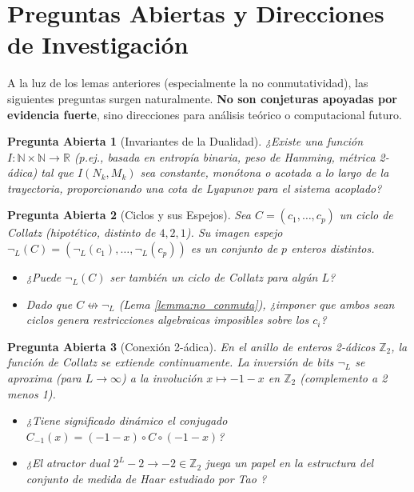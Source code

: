 \documentclass[11pt,a4paper]{article}
\newtheorem{question}{Pregunta Abierta}
\begin{document}
\section{Preguntas Abiertas y Direcciones de Investigación}
\label{sec:open}

A la luz de los lemas anteriores (especialmente la no conmutatividad), las siguientes preguntas surgen naturalmente. \textbf{No son conjeturas apoyadas por evidencia fuerte}, sino direcciones para análisis teórico o computacional futuro.

\begin{question}[Invariantes de la Dualidad]
\label{q:invariantes}
¿Existe una función $I: \mathbb{N} \times \mathbb{N} \to \mathbb{R}$ (p.ej., basada en entropía binaria, peso de Hamming, métrica 2-ádica) tal que $I(N_k, M_k)$ sea constante, monótona o acotada a lo largo de la trayectoria, proporcionando una cota de Lyapunov para el sistema acoplado?
\end{question}

\begin{question}[Ciclos y sus Espejos]
\label{q:ciclos}
Sea $C = (c_1, \dots, c_p)$ un ciclo de Collatz (hipotético, distinto de $4,2,1$). Su imagen espejo $\neg_L(C) = (\neg_L(c_1), \dots, \neg_L(c_p))$ es un conjunto de $p$ enteros distintos.
\begin{itemize}
    \item ¿Puede $\neg_L(C)$ ser \textit{también} un ciclo de Collatz para algún $L$?
    \item Dado que $C \not\leftrightarrow \neg_L$ (Lema \ref{lemma:no_conmuta}), ¿imponer que ambos sean ciclos genera restricciones algebraicas imposibles sobre los $c_i$?
\end{itemize}
\end{question}

\begin{question}[Conexión 2-ádica]
\label{q:2adicos}
En el anillo de enteros 2-ádicos $\mathbb{Z}_2$, la función de Collatz se extiende continuamente. La inversión de bits $\neg_L$ se aproxima (para $L \to \infty$) a la involución $x \mapsto -1 - x$ en $\mathbb{Z}_2$ (complemento a 2 menos 1).
\begin{itemize}
    \item ¿Tiene significado dinámico el conjugado $C_{-1}(x) = (-1 - x) \circ C \circ (-1 - x)$?
    \item ¿El atractor dual $2^L-2 \to -2 \in \mathbb{Z}_2$ juega un papel en la estructura del conjunto de medida de Haar estudiado por Tao \cite{tao}?
\end{itemize}
\end{question}
\end{document}
